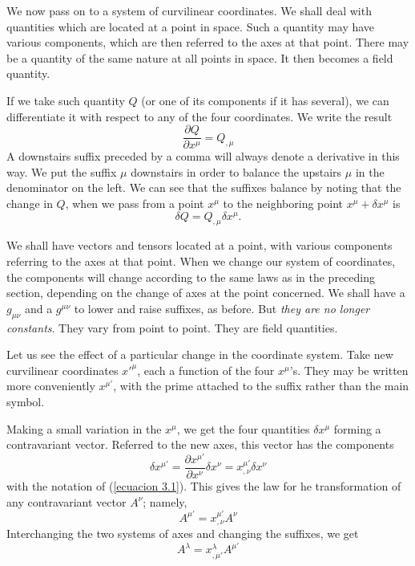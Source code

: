 We now pass on to a system of curvilinear coordinates. We shall deal with 
quantities which are located at a point in space. Such a  quantity may have 
various components, which are then referred to the axes at that point. There may 
be a quantity of the same nature at all points in space. It then becomes a field 
quantity.

If we take such quantity $Q$ (or one of its components if it has several), we 
can differentiate it with respect to any of the four coordinates. We write the 
result
\[
 \frac{\partial Q}{\partial x^\mu} = Q_{,\mu}
\]
A downstairs suffix preceded by a comma will always denote a derivative in this 
way. We put the suffix $\mu$ downstairs in order to balance the upstairs $\mu$ 
in the denominator on the left. We can see that the suffixes balance by noting 
that the change in $Q$, when we pass from a point $x^\mu$ to the neighboring 
point $x^\mu + \delta x^\mu$ is
\begin{equation}
 \label{ecuacion 3.1}
 \delta Q = Q_{,\mu} \delta x^\mu .
\end{equation}

We shall have vectors and tensors located at a point, with various components 
referring to the axes at that point. When we change our system of coordinates, 
the components will change according to the same laws as in the preceding 
section, depending on the change of axes at the point concerned. We shall have a 
$g_{\mu\nu}$ and a $g^{\mu\nu}$ to lower and raise suffixes, as before. But 
\emph{they are no longer constants}. They vary from point to point. They are 
field quantities.

Let us see the effect of a particular change in the coordinate system. Take new 
curvilinear coordinates ${x'}^{\mu}$, each a function of the four 
$x^{\mu}$'s. They may be written more conveniently $x^{\mu'}$, with the prime 
attached to the suffix rather than the main symbol.

Making a small variation in the $x^{\mu}$, we get the four quantities $\delta 
x^{\mu}$ forming a contravariant vector. Referred to the new axes, this vector 
has the components
\[
    \delta {x^{\mu'}} 
    = \frac{\partial x^{\mu'}}{\partial x^{\nu}} \delta x^{\nu}
    = x^{\mu'}_{,\nu} \delta x^\nu
\]
with the notation of (\ref{ecuacion 3.1}). This gives the law for he 
transformation of any contravariant vector $A^{\nu}$; namely,
\begin{equation}
 \label{ecuacion 3.2}
 A^{\mu'} = x^{\mu'}_{,\nu} A^\nu
\end{equation}
Interchanging the two systems of axes and changing the suffixes, we get
\begin{equation}
 \label{ecuacion 3.3}
 A^{\lambda} = x^{\lambda}_{,\mu'} A^{\mu'}
\end{equation}

